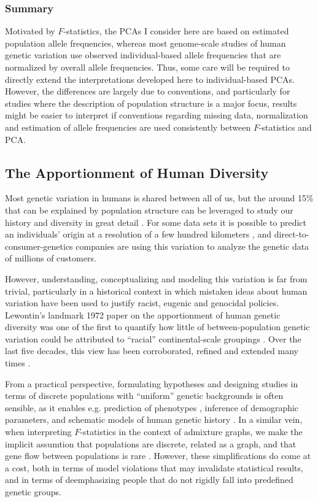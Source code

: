 \documentclass[12pt,fullpage, a4paper]{article}
\begin{document}
\subsubsection{Summary}
Motivated by $F$-statistics, the PCAs I consider here are based on estimated population allele frequencies, whereas most genome-scale studies of human genetic variation use observed individual-based allele frequencies that are normalized by overall allele frequencies. Thus, some care will be required to directly extend the interpretations developed here to individual-based PCAs. However, the differences are largely due to conventions, and particularly for studies where the description of population structure is a major focus, results might be easier to interpret if conventions regarding missing data, normalization and estimation of allele frequencies are used consistently between $F$-statistics and PCA.

\subsection{The Apportionment of Human Diversity}
Most genetic variation in humans is shared between all of us, but the around 15\% that can be explained by population structure can be leveraged to study our history and diversity in great detail \citep{dobzhansky1972, cavalli-sforza1994, novembre2022}. For some data sets it is possible to predict an individuals' origin at a resolution of a few hundred kilometers \citep{novembre2008, leslie2015}, and direct-to-consumer-genetics companies are using this variation to analyze the genetic data of millions of customers. 

However, understanding, conceptualizing and modeling this variation is far from trivial, particularly in a historical context in which mistaken ideas about human variation have been used to justify racist, eugenic and genocidal policies. Lewontin’s landmark 1972 paper on the apportionment of human genetic diversity was one of the first to quantify how little of between-population genetic variation could be attributed to ``racial'' continental-scale groupings \citep{novembre2022}. Over the last five decades, this view has been corroborated, refined and extended many times \citep{cann1987, cavalli-sforza1994, barbujani1997, rosenberg2002a}. 

From a practical perspective, formulating hypotheses and designing studies in terms of discrete populations with ``uniform'' genetic backgrounds is often sensible, as it enables  e.g. prediction of phenotypes \citep{berg2019, yair2021}, inference of demographic parameters, and schematic models of human genetic history \citep{patterson2012}. In a similar vein, when interpreting $F$-statistics in the context of admixture graphs, we make the  implicit assumtion that populations are discrete, related as a graph, and that gene flow between populations is rare \citep{patterson2012,harney2021}.
However, these simplifications do come at a cost, both in terms of model violations that may invalidate statistical results, and in terms of deemphasizing people that do not rigidly fall into predefined genetic groups.
\end{document}

